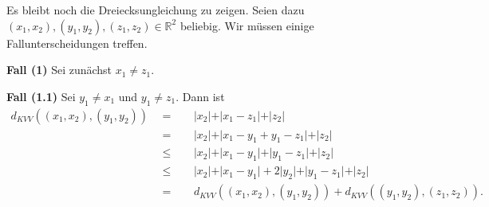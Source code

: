 \documentclass[11pt]{book}
\numberwithin{dummy}{section}
\theoremstyle{nonumberbreak}
\newenvironment{prob}[1][]{\ifthenelse{\equal{#1}{}}{\problem}{\problem[#1]}\rm}{\endproblem}
\newenvironment{sol}[1][]{\ifthenelse{\equal{#1}{}}{\solution}{\solution[#1]}\rm}{\endsolution}
\newcommand{\R}{\mathbb{R}}
\begin{document}
\begin{spacing}{1.4}
\begin{prob}
\begin{sol}
\begin{compactenum}
\item Es bleibt noch die Dreiecksungleichung zu zeigen. Seien dazu $(x_1,x_2), (y_1,y_2), (z_1,z_2) \in \R^2$ beliebig. Wir müssen einige Fallunterscheidungen treffen.
\begin{compactenum}
\item[\textbf{Fall (1)}] Sei zunächst $x_1\neq z_1$. 
\begin{compactenum}

\item[\textbf{Fall (1.1)}] Sei $y_1 \neq x_1$ und $y_1 \neq z_1$. Dann ist
\begin{alignat*}{5}
d_{KVV}((x_1,x_2), (y_1,y_2)) \ \ &=&& \ \ \vert x_2\vert + \vert x_1-z_1\vert + \vert z_2 \vert \\
&=&& \ \ \vert x_2 \vert + \vert x_1-y_1+y_1-z_1\vert + \vert z_2\vert \\
&\leqslant&& \ \ \vert x_2\vert + \vert x_1 - y_1\vert + \vert y_1-z_1\vert + \vert z_2\vert \\
&\leqslant&& \ \ \vert x_2 \vert + \vert x_1-y_1\vert + 2 \vert y_2\vert + \vert y_1-z_1\vert + \vert z_2\vert \\
&=&& \ \ d_{KVV}((x_1,x_2),(y_1,y_2)) + d_{KVV}((y_1,y_2),(z_1,z_2)).
\end{alignat*}


\end{compactenum}
\end{compactenum}
\end{compactenum}
\end{sol}
\end{prob}
\end{spacing}
\end{document}

